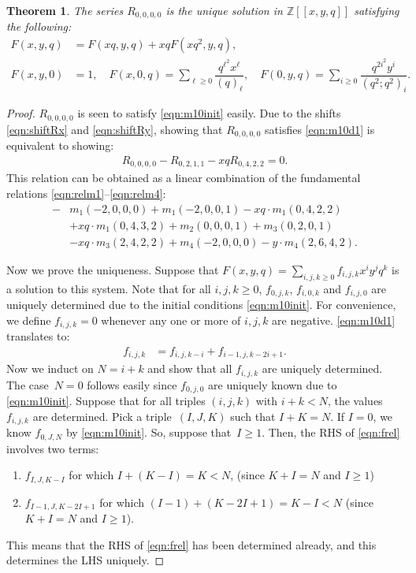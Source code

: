 \documentclass[10pt]{article}
\newtheorem{thm}{Theorem}[section]
\newcommand{\ZZ}{\mathbb{Z}}
\begin{document}
\begin{thm}
The series $R_{0,0,0,0}$ is the unique solution in $\ZZ[[x,y,q]]$ satisfying
the following:
\begin{align}
F(x,y,q) &= F(xq,y,q) + xqF\left(xq^2,y,q\right) \label{eqn:m10d1},\\
F(x,y,0) &= 1,\quad 
F(x,0,q) = \sum_{\ell\geq 0}\dfrac{q^{\ell^2}x^\ell}{(q)_\ell},\quad 
F(0,y,q) = \sum_{i\geq 0}\dfrac{q^{2i^2}y^i}{(q^2;q^2)_i}. \label{eqn:m10init}
\end{align}
\end{thm}
\begin{proof}
$R_{0,0,0,0}$ is seen to satisfy \eqref{eqn:m10init} easily.
Due to the shifts \eqref{eqn:shiftRx} and \eqref{eqn:shiftRy}, showing that $R_{0,0,0,0}$ satisfies
\eqref{eqn:m10d1} is equivalent to showing:
\begin{align}
R_{0,0,0,0} - R_{0,2,1,1} - xqR_{0,4,2,2} = 0.
\end{align}
This relation can be obtained as a linear combination of the fundamental relations \eqref{eqn:relm1}--\eqref{eqn:relm4}:
\begin{align}
-&m_1(-2,0,0,0)+m_1(-2,0,0,1)-xq\cdot m_1(0,4,2,2)
\nonumber\\
&+xq\cdot m_1(0,4,3,2)+m_2(0,0,0,1)+m_3(0,2,0,1)
\nonumber \\
&-xq\cdot m_3(2,4,2,2)+m_4(-2,0,0,0)-y\cdot m_4(2,6,4,2).
\end{align}

Now we prove the uniqueness. 
Suppose that $F(x,y,q)=\sum_{i,j,k\geq 0}f_{i,j,k}x^iy^jq^k$ is a solution to this system.
Note that for all $i,j,k\geq 0$, $f_{0,j,k}$, $f_{i,0,k}$ and $f_{i,j,0}$ 
are uniquely determined due to the initial conditions 
\eqref{eqn:m10init}.
For convenience, we define $f_{i,j,k}=0$ whenever any one or more of $i,j,k$ are negative.
\eqref{eqn:m10d1} translates to:
\begin{align}
f_{i,j,k}&=f_{i,j,k-i}+f_{i-1,j,k-2i+1}.
\label{eqn:frel}
\end{align}
Now we induct on $N=i+k$ and show that all $f_{i,j,k}$ are uniquely determined.
The case~$N=0$ follows easily since $f_{0,j,0}$ are uniquely known due to \eqref{eqn:m10init}.
Suppose that for all triples $(i,j,k)$ with $i+k<N$, the values $f_{i,j,k}$ are determined.
Pick a triple~$(I,J,K)$ such that $I+K=N$. 
If $I=0$, we know $f_{0,J,N}$ by \eqref{eqn:m10init}.
So, suppose that~$I\geq 1$. 
Then, the RHS of \eqref{eqn:frel} involves two terms:
\begin{enumerate}
\item $f_{I,J,K-I}$ for which $I+(K-I) = K < N$, (since $K+I=N$ and $I\geq 1$)
\item $f_{I-1,J,K-2I+1}$ for which $(I-1)+(K-2I+1) = K - I < N$ (since $K+I=N$ and $I\geq 1$).
\end{enumerate}
This means that the RHS of \eqref{eqn:frel} has been determined already, and this determines
the LHS uniquely.
\end{proof}
\end{document}

